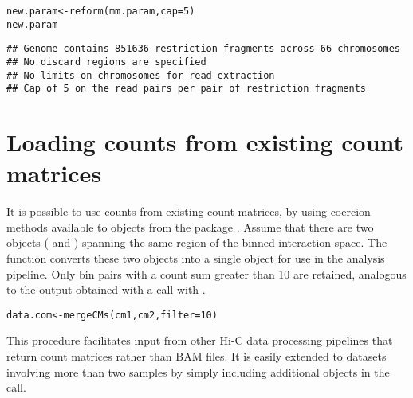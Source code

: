 \documentclass{report}\usepackage[]{graphicx}\usepackage[usenames,dvipsnames]{color}
\newcommand{\hlnum}[1]{\textcolor[rgb]{0.816,0.125,0.439}{#1}}%
\newcommand{\hlstd}[1]{\textcolor[rgb]{0.251,0.251,0.251}{#1}}%
\newcommand{\hlkwb}[1]{\textcolor[rgb]{0,0,0}{#1}}%
\newcommand{\hlkwc}[1]{\textcolor[rgb]{0.251,0.251,0.251}{#1}}%
\newcommand{\hlkwd}[1]{\textcolor[rgb]{0.878,0.439,0.125}{#1}}%
\newenvironment{knitrout}{}{} %
\begin{document}
\begin{knitrout}
\color{fgcolor}\begin{kframe}
\begin{alltt}
\hlstd{new.param} \hlkwb{<-} \hlkwd{reform}\hlstd{(mm.param,} \hlkwc{cap}\hlstd{=}\hlnum{5}\hlstd{)}
\hlstd{new.param}
\end{alltt}
\begin{verbatim}
## Genome contains 851636 restriction fragments across 66 chromosomes
## No discard regions are specified
## No limits on chromosomes for read extraction
## Cap of 5 on the read pairs per pair of restriction fragments
\end{verbatim}
\end{kframe}
\end{knitrout}

\section{Loading counts from existing count matrices}
It is possible to use counts from existing count matrices, by using coercion methods available to  objects from the  package \cite{lun2016infrastructure}.
Assume that there are two  objects ( and ) spanning the same region of the binned interaction space.
The  function converts these two objects into a single  object for use in the  analysis pipeline.
Only bin pairs with a count sum greater than 10 are retained, analogous to the output obtained with a  call with .



\begin{knitrout}
\color{fgcolor}\begin{kframe}
\begin{alltt}
\hlstd{data.com} \hlkwb{<-} \hlkwd{mergeCMs}\hlstd{(cm1, cm2,} \hlkwc{filter}\hlstd{=}\hlnum{10}\hlstd{)}
\end{alltt}
\end{kframe}
\end{knitrout}

This procedure facilitates input from other Hi-C data processing pipelines that return count matrices rather than BAM files.
It is easily extended to datasets involving more than two samples by simply including additional  objects in the  call.
\end{document}
